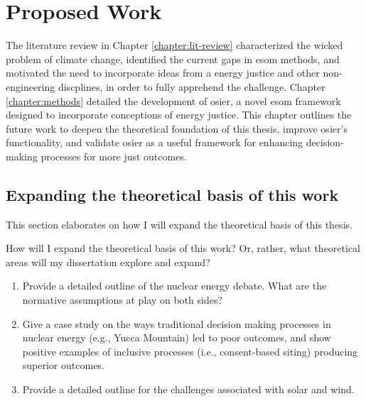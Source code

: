 \chapter{Proposed Work}

The literature review in Chapter \ref{chapter:lit-review} characterized the
wicked problem of climate change, identified the current gaps in \ac{esom}
methods, and motivated the need to incorporate ideas from a energy justice and
other non-engineering discplines, in order to fully apprehend the challenge.
Chapter \ref{chapter:methods} detailed the development of \ac{osier}, a novel
\ac{esom} framework designed to incorporate conceptions of energy justice. This
chapter outlines the future work to deepen the theoretical foundation of this
thesis, improve \ac{osier}'s functionality, and validate \ac{osier} as a useful
framework for enhancing decision-making processes for more just outcomes.

\section{Expanding the theoretical basis of this work}

This section elaborates on how I will expand the theoretical basis of this
thesis.

How will I expand the theoretical basis of this work? Or, rather, what
theoretical areas will my dissertation explore and expand?
\begin{enumerate}
    \item Provide a detailed outline of the nuclear energy debate. What are the
    normative assumptions at play on both sides?
    \item Give a case study on the ways traditional decision making processes in
    nuclear energy (e.g., Yucca Mountain) led to poor outcomes, and show
    positive examples of inclusive processes (i.e., consent-based siting)
    producing superior outcomes.
    \item Provide a detailed outline for the challenges associated with solar
    and wind.
\end{enumerate}


